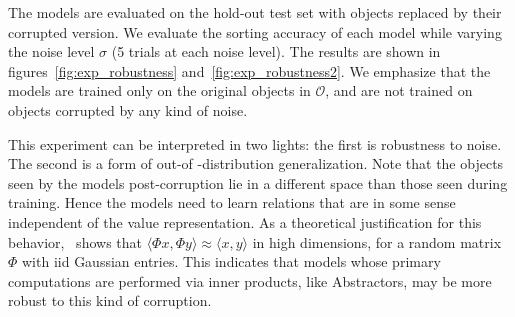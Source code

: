 The models are evaluated on the hold-out test set with objects replaced by their corrupted version. We evaluate the sorting accuracy of each model while varying the noise level $\sigma$ (5 trials at each noise level). The results are shown in figures~\ref{fig:exp_robustness} and~\ref{fig:exp_robustness2}. We emphasize that the models are trained only on the original objects in $\mathcal{O}$, and are not trained on objects corrupted by any kind of noise.

This experiment can be interpreted in two lights: the first is robustness to noise. The second is a form of out-of
-distribution generalization. Note that the objects seen by the models post-corruption lie in a different space than
those seen during training. Hence the models need to learn relations that
are in some sense independent of the value representation.
As a theoretical justification for this behavior,~\cite{zhouCompressedPrivacySensitive2009} shows that $\langle \Phi x, \Phi y \rangle \approx \langle x, y \rangle$ in high dimensions, for a random matrix $\Phi$ with iid Gaussian entries. This indicates that models whose primary computations are performed via inner products, like Abstractors, may be more robust to this kind of corruption.

